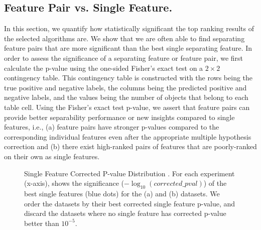 \subsection{Feature Pair vs. Single Feature.}\label{sec:FPvSF}

In this section, we quantify how statistically significant the top ranking results of the selected algorithms are. We show that we are often able to find separating feature pairs that are more significant than the best single separating feature. In order to assess the significance of a separating feature or feature pair, we first calculate the p-value using the one-sided Fisher's exact test on a $2\times2$ contingency table. This contingency table is constructed with the rows being the true positive and negative labels, the columns being the predicted positive and negative labels, and the values being the number of objects that belong to each table cell. Using the Fisher's exact test p-value, we assert that feature pairs can provide better separability performance or new insights compared to single features, i.e., (a) feature pairs have stronger p-values compared to the corresponding individual features even after the appropriate multiple hypothesis correction and (b) there exist high-ranked pairs of features that are poorly-ranked on their own as single features.

\begin{figure}[h]
\centering %
\vspace{-5mm}
\vspace{-5mm}
\caption{Single Feature Corrected P-value Distribution . For each experiment (x-axis), shows the significance ($-\log_{10} (corrected\_pval)$) of the \tophundred best single features (blue dots) for the (a) \msig and (b) \lincs datasets. We order the datasets by their best corrected single feature p-value, and discard the datasets where no single feature has corrected p-value better than $10^{-5}$.}
\vspace{-5mm}
\label{fig:singleF}
\end{figure}


